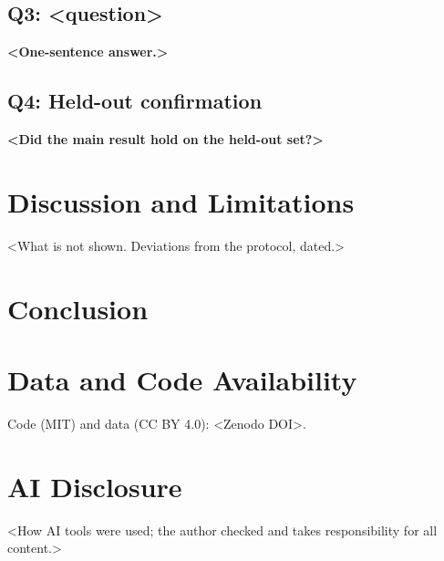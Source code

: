 \documentclass[conference]{IEEEtran}
\begin{document}
\subsection{Q3: <question>}
\textbf{<One-sentence answer.>}
\subsection{Q4: Held-out confirmation}
\textbf{<Did the main result hold on the held-out set?>}

\section{Discussion and Limitations}
<What is not shown. Deviations from the protocol, dated.>

\section{Conclusion}
\section*{Data and Code Availability}
Code (MIT) and data (CC BY 4.0): <Zenodo DOI>.
\section*{AI Disclosure}
<How AI tools were used; the author checked and takes responsibility for all content.>



\end{document}
